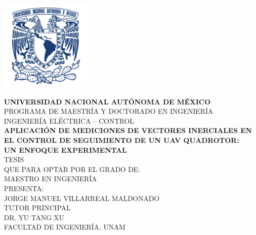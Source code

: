 \documentclass[11pt,letterpaper,twoside,openright]{report}
\begin{document}

\thispagestyle{empty}

\begin{titlepage}
	
	\begin{center}
		\includegraphics[height=4.5cm]{UNAM.png}	
	\end{center}
	
	\begin{center}
		\textbf{{\Large UNIVERSIDAD NACIONAL AUTÓNOMA DE MÉXICO}}\\
		PROGRAMA DE MAESTRÍA Y DOCTORADO EN INGENIERÍA\\
		INGENIERÍA ELÉCTRICA – CONTROL\\
		\vspace{2cm}
		\textbf{APLICACIÓN DE MEDICIONES DE VECTORES INERCIALES EN EL CONTROL DE SEGUIMIENTO DE UN UAV QUADROTOR: UN ENFOQUE EXPERIMENTAL}
		\\
		\vspace{2cm}
		TESIS\\
		QUE PARA OPTAR POR EL GRADO DE:\\
		MAESTRO EN INGENIERÍA\\
		\vspace{2cm}
		PRESENTA:\\
		JORGE MANUEL VILLARREAL MALDONADO\\
		\vspace{1.8cm}
		TUTOR PRINCIPAL\\
		DR. YU TANG XU\\
		FACULTAD DE INGENIERÍA, UNAM\\
		

\end{center}
\end{titlepage}
\end{document}

